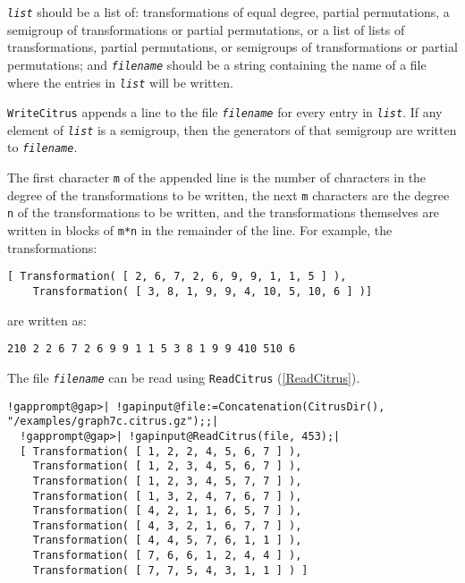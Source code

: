 \documentclass[a4paper,11pt]{report}
\begin{document}
{{{ \mbox{\texttt{\mdseries\slshape list}} should be a list of: transformations of equal degree, partial permutations, a
semigroup of transformations or partial permutations, or a list of lists of
transformations, partial permutations, or semigroups of transformations or
partial permutations; and \mbox{\texttt{\mdseries\slshape filename}} should be a string containing the name of a file where the entries in \mbox{\texttt{\mdseries\slshape list}} will be written. 

 \texttt{WriteCitrus} appends a line to the file \mbox{\texttt{\mdseries\slshape filename}} for every entry in \mbox{\texttt{\mdseries\slshape list}}. If any element of \mbox{\texttt{\mdseries\slshape list}} is a semigroup, then the generators of that semigroup are written to \mbox{\texttt{\mdseries\slshape filename}}. 

 The first character \texttt{m} of the appended line is the number of characters in the degree of the
transformations to be written, the next \texttt{m} characters are the degree \texttt{n} of the transformations to be written, and the transformations themselves are
written in blocks of \texttt{m*n} in the remainder of the line. For example, the transformations: 
\begin{Verbatim}[commandchars=!@|,fontsize=\small,frame=single,label=Example]
  [ Transformation( [ 2, 6, 7, 2, 6, 9, 9, 1, 1, 5 ] ), 
    Transformation( [ 3, 8, 1, 9, 9, 4, 10, 5, 10, 6 ] )]
\end{Verbatim}
 are written as: 
\begin{Verbatim}[commandchars=!@|,fontsize=\small,frame=single,label=Example]
  210 2 2 6 7 2 6 9 9 1 1 5 3 8 1 9 9 410 510 6
\end{Verbatim}
 The file \mbox{\texttt{\mdseries\slshape filename}} can be read using \texttt{ReadCitrus} (\ref{ReadCitrus}). 

 
\begin{Verbatim}[commandchars=!@|,fontsize=\small,frame=single,label=Example]
  !gapprompt@gap>| !gapinput@file:=Concatenation(CitrusDir(), "/examples/graph7c.citrus.gz");;|
  !gapprompt@gap>| !gapinput@ReadCitrus(file, 453);|
  [ Transformation( [ 1, 2, 2, 4, 5, 6, 7 ] ), 
    Transformation( [ 1, 2, 3, 4, 5, 6, 7 ] ), 
    Transformation( [ 1, 2, 3, 4, 5, 7, 7 ] ), 
    Transformation( [ 1, 3, 2, 4, 7, 6, 7 ] ), 
    Transformation( [ 4, 2, 1, 1, 6, 5, 7 ] ), 
    Transformation( [ 4, 3, 2, 1, 6, 7, 7 ] ), 
    Transformation( [ 4, 4, 5, 7, 6, 1, 1 ] ), 
    Transformation( [ 7, 6, 6, 1, 2, 4, 4 ] ), 
    Transformation( [ 7, 7, 5, 4, 3, 1, 1 ] ) ]
\end{Verbatim}
 }

}}
\end{document}
